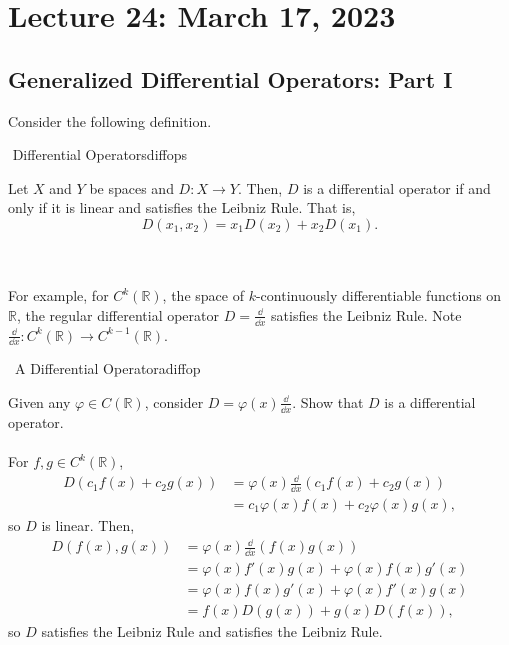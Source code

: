 \pagebreak

\section{Lecture 24: March 17, 2023}

    \subsection{Generalized Differential Operators: Part I}

        Consider the following definition.
        \begin{definition}{\Stop\,\,Differential Operators}{diffops}
            
            Let \(X\) and \(Y\) be spaces and \(D:X\to Y\). Then, \(D\) is a differential operator if and only if it is linear and satisfies the Leibniz Rule. That is,
            \begin{equation*}
                D(x_1,x_2)=x_1D(x_2)+x_2D(x_1).
            \end{equation*}

        \end{definition}
        \vphantom
        \\
        \\
        For example, for \(C^k(\mathbb{R})\), the space of \(k\)-continuously differentiable functions on \(\mathbb{R}\), the regular differential operator \(D=\frac{\dd}{\dd x}\) satisfies the Leibniz Rule. Note \(\frac{\dd}{\dd x}:C^k(\mathbb{R})\to C^{k-1}(\mathbb{R})\).
        \begin{example}{\Difficulty\,\Difficulty\,\,A Differential Operator}{adiffop}
            
            Given any \(\varphi\in C(\mathbb{R})\), consider \(D=\varphi(x)\frac{\dd}{\dd x}\). Show that \(D\) is a differential operator.
            \\
            \\
            For \(f,g\in C^k(\mathbb{R})\),
            \begin{align*}
                D(c_1f(x)+c_2g(x))&=\varphi(x)\frac{\dd}{\dd x}(c_1f(x)+c_2g(x)) \\
                &=c_1\varphi(x)f(x)+c_2\varphi(x)g(x),
            \end{align*}
            so \(D\) is linear. Then,
            \begin{align*}
                D(f(x),g(x))&=\varphi(x)\frac{\dd}{\dd x}(f(x)g(x)) \\
                &=\varphi(x)f'(x)g(x)+\varphi(x)f(x)g'(x) \\
                &=\varphi(x)f(x)g'(x)+\varphi(x)f'(x)g(x) \\
                &=f(x)D(g(x))+g(x)D(f(x)),
            \end{align*}
            so \(D\) satisfies the Leibniz Rule and satisfies the Leibniz Rule.
            
        \end{example}
